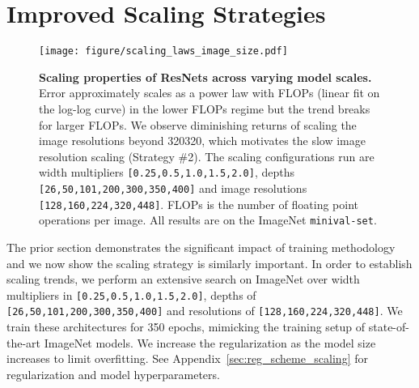 \documentclass{article}
\begin{document}
 \section{Improved Scaling Strategies \label{sec:scaling_strategies}}
\begin{figure}[t!]
    \begin{center}
    \texttt{[image: figure/scaling\_laws\_image\_size.pdf]}
    \end{center}
    \vspace{-0.3cm}
    \caption{\textbf{Scaling properties of ResNets across varying model scales.} 
    Error approximately scales as a power law with FLOPs (linear fit on the log-log curve) in the lower FLOPs regime but the trend breaks for larger FLOPs.
    We observe diminishing returns of scaling the image resolutions beyond 320320, which motivates the slow image resolution scaling (Strategy \#2). 
    The scaling configurations run are width multipliers \texttt{[0.25,0.5,1.0,1.5,2.0]}, depths \texttt{[26,50,101,200,300,350,400]} and image resolutions \texttt{[128,160,224,320,448]}.
    FLOPs is the number of floating point operations per image. 
    All results are on the ImageNet \texttt{minival-set}.}
    \label{fig:scaling_image_size}
    \vspace{-0.1cm}
\end{figure}

The prior section demonstrates the significant impact of training methodology and we now show the scaling strategy is similarly important.
In order to establish scaling trends, we perform an extensive search on ImageNet over width multipliers in \texttt{[0.25,0.5,1.0,1.5,2.0]}, depths of \texttt{[26,50,101,200,300,350,400]} and resolutions of \texttt{[128,160,224,320,448]}.
We train these architectures for 350 epochs, mimicking the training setup of state-of-the-art ImageNet models.
We increase the regularization as the model size increases to limit overfitting. 
See Appendix~\ref{sec:reg_scheme_scaling} for regularization and model hyperparameters.
\end{document}
